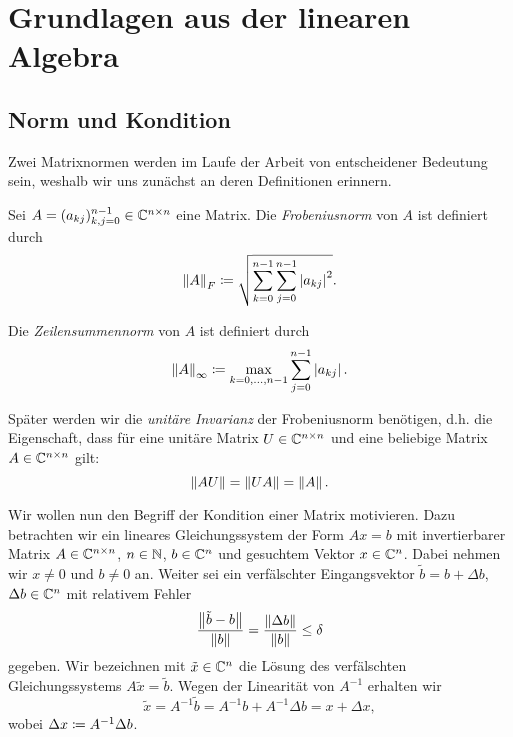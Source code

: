 \chapter{Grundlagen aus der linearen Algebra}
\section{Norm und Kondition}
Zwei Matrixnormen werden im Laufe der Arbeit von entscheidener Bedeutung sein,
weshalb wir uns zunächst an deren Definitionen erinnern.

\begin{mydef}
    Sei $A = (a_{kj})_{k,j=0}^{n-1} \in \mathbb{C}^{n\times n}$ eine Matrix.
    Die \emph{Frobeniusnorm} von $A$ ist definiert durch
    \begin{equation}
        \label{eq:frobenius_norm}
        \left\lVert A \right\rVert_F
        \coloneqq \sqrt{ \sum_{k=0}^{n-1} \sum_{j=0}^{n-1} \left\lvert a_{kj} \right\rvert^2}.
    \end{equation}

    \noindent Die \emph{Zeilensummennorm} von $A$ ist definiert durch
    \begin{equation}
        \label{eq:infinity_norm}
        \left\lVert A \right\rVert_\infty
        \coloneqq \max_{k=0, \dots, n-1} \sum_{j=0}^{n-1} \left\lvert a_{kj} \right\rvert.
    \end{equation}
\end{mydef}

\begin{remark}
    Später werden wir die \emph{unitäre Invarianz} der
    Frobeniusnorm benötigen, d.h. die Eigenschaft, dass für eine unitäre Matrix
    $U \in \mathbb{C}^{n\times n}$ und eine beliebige Matrix $A \in \mathbb{C}^{n\times n}$
    gilt:
    \[
        \left\lVert A U \right\rVert = \left\lVert U A \right\rVert = \left\lVert A \right\rVert.
    \]
\end{remark}

Wir wollen nun den Begriff der Kondition einer Matrix motivieren.
Dazu betrachten wir ein lineares Gleichungssystem der Form
$Ax = b$ mit invertierbarer Matrix
$A \in \mathbb{C}^{n \times n}$, $n \in \mathbb{N}$, $b \in \mathbb{C}^n$
und gesuchtem Vektor $x \in \mathbb{C}^n$.
Dabei nehmen wir $x \neq 0$ und $b \neq 0$ an.
Weiter sei ein verfälschter Eingangsvektor $\tilde{b} = b + \Delta b$,
$\Delta b \in \mathbb{C}^n$ mit relativem Fehler
\[
    \frac{\left\lVert \tilde{b} - b \right\rVert}{\left\lVert b \right\rVert} = \frac{\left\lVert \Delta b \right\rVert}{\left\lVert b \right\rVert} \leq \delta
\]
gegeben.
Wir bezeichnen mit $\tilde{x} \in \mathbb{C}^n$ die Lösung des verfälschten Gleichungssystems
$A \tilde{x} = \tilde{b}$.
Wegen der Linearität von $A^{-1}$ erhalten wir
\[
    \tilde{x} = A^{-1} \tilde{b} = A^{-1} b + A^{-1} \Delta b = x + \Delta x,
\]
wobei $\Delta x \coloneqq A^{-1} \Delta b$.

